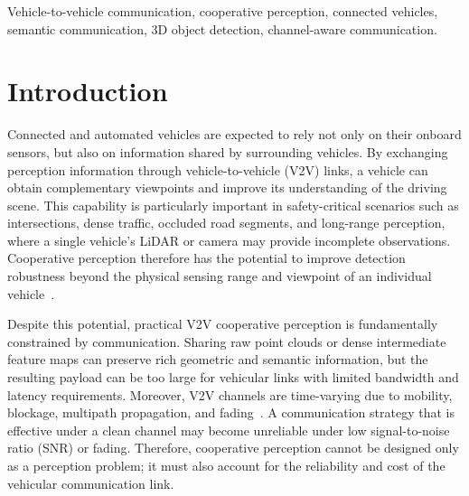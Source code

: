 \documentclass[journal]{IEEEtran}
\begin{document}
\begin{abstract}
${\approx}12\%$ at matched F1---whereas under graceful importance-map JSCC the estimated SNR becomes uninformative, so the granularity decision turns content-bound and---in-distribution---requires the task cues that an SNR threshold cannot substitute for; under deep fading the codec instead sets feasibility, the digital feature branch turning infeasible over the evaluated SNR range while the graceful JSCC branch, modelled as analog transmission, survives. The deployed selector incurs $52.8$~ms per frame on a single CPU core, fitting the $100$~ms budget of a 10~Hz LiDAR cycle. These results demonstrate that channel-aware semantic granularity adaptation is an effective strategy for bandwidth-constrained V2V cooperative perception.
\end{abstract}

\begin{IEEEkeywords}
Vehicle-to-vehicle communication, cooperative perception, connected vehicles, semantic communication, 3D object detection, channel-aware communication.
\end{IEEEkeywords}

\section{Introduction}

Connected and automated vehicles are expected to rely not only on their onboard sensors, but also on information shared by surrounding vehicles. By exchanging perception information through vehicle-to-vehicle (V2V) links, a vehicle can obtain complementary viewpoints and improve its understanding of the driving scene. This capability is particularly important in safety-critical scenarios such as intersections, dense traffic, occluded road segments, and long-range perception, where a single vehicle's LiDAR or camera may provide incomplete observations. Cooperative perception therefore has the potential to improve detection robustness beyond the physical sensing range and viewpoint of an individual vehicle~\cite{xu2022opv2v,xu2022v2xvit}.

Despite this potential, practical V2V cooperative perception is fundamentally constrained by communication. Sharing raw point clouds or dense intermediate feature maps can preserve rich geometric and semantic information, but the resulting payload can be too large for vehicular links with limited bandwidth and latency requirements. Moreover, V2V channels are time-varying due to mobility, blockage, multipath propagation, and fading~\cite{ieee80211bd,3gpp37885}. A communication strategy that is effective under a clean channel may become unreliable under low signal-to-noise ratio (SNR) or fading. Therefore, cooperative perception cannot be designed only as a perception problem; it must also account for the reliability and cost of the vehicular communication link.
\end{document}
